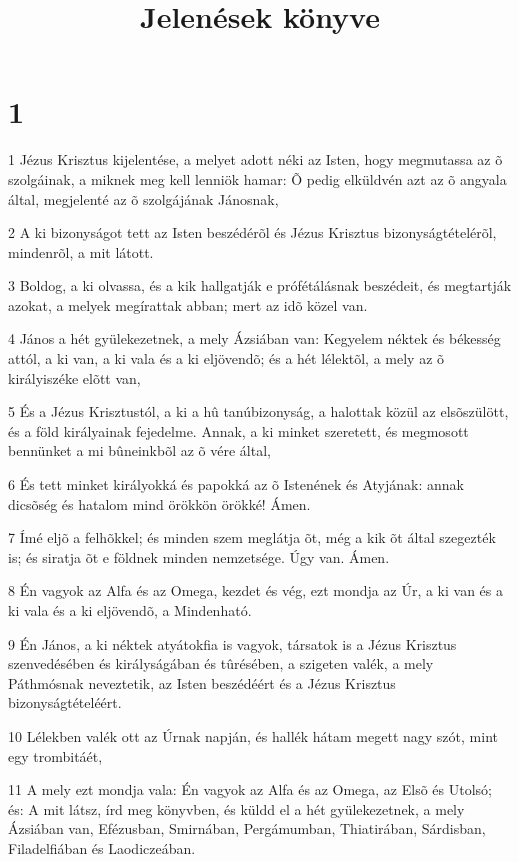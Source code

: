 

\title{Jelenések könyve}


\chapter{1}

\par 1 Jézus Krisztus kijelentése, a melyet adott néki az Isten, hogy megmutassa az õ szolgáinak, a miknek meg kell lenniök hamar: Õ pedig elküldvén azt az õ angyala által, megjelenté az õ szolgájának Jánosnak,
\par 2 A ki bizonyságot tett az Isten beszédérõl és Jézus Krisztus bizonyságtételérõl, mindenrõl, a mit látott.
\par 3 Boldog, a ki olvassa, és a kik hallgatják e prófétálásnak beszédeit, és megtartják azokat, a melyek megírattak abban; mert  az idõ közel van.
\par 4 János a hét gyülekezetnek, a mely Ázsiában van: Kegyelem néktek és békesség attól, a ki van, a ki vala és a ki eljövendõ; és a hét lélektõl, a  mely az õ királyiszéke elõtt van,
\par 5 És a Jézus Krisztustól, a ki a hû tanúbizonyság, a halottak közül az elsõszülött, és a föld királyainak fejedelme. Annak, a ki minket szeretett, és megmosott bennünket a mi bûneinkbõl az õ vére által,
\par 6 És tett minket királyokká és papokká az õ Istenének és Atyjának: annak dicsõség és hatalom mind örökkön örökké! Ámen.
\par 7 Ímé eljõ a felhõkkel; és minden szem meglátja õt, még a kik õt által szegezték is; és siratja õt  e földnek minden nemzetsége. Úgy van. Ámen.
\par 8 Én vagyok az Alfa és az Omega, kezdet és vég, ezt mondja az Úr, a ki van és a ki vala és a ki eljövendõ, a Mindenható.
\par 9 Én János, a ki néktek atyátokfia is vagyok, társatok is a Jézus Krisztus szenvedésében és királyságában és tûrésében, a szigeten valék, a mely Páthmósnak neveztetik, az Isten beszédéért és a Jézus Krisztus bizonyságtételéért.
\par 10 Lélekben valék ott az Úrnak napján, és hallék hátam megett nagy szót, mint egy trombitáét,
\par 11 A mely ezt mondja vala: Én vagyok az Alfa és az Omega, az Elsõ és Utolsó; és: A mit látsz, írd meg könyvben, és küldd el a hét gyülekezetnek, a mely Ázsiában van, Efézusban, Smirnában, Pergámumban, Thiatirában, Sárdisban, Filadelfiában és Laodiczeában.
